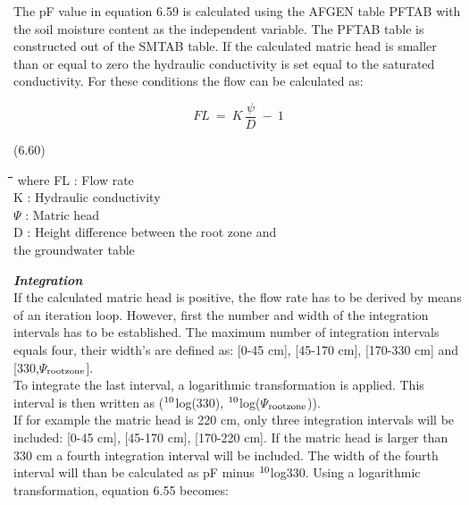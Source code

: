 \documentclass[11pt]{article}
\begin{document}
\bigskip
The pF value in equation 6.59 is calculated using the AFGEN table PFTAB with the soil
moisture content as the independent variable. The PFTAB table is constructed out of the
SMTAB table. If the calculated matric head is smaller than or equal to zero the hydraulic
conduc\-tivity is set equal to the saturated conductivity. For these conditions the flow can
be calculat\-ed as:

\begin{displaymath}
FL~=~K\,{\frac{\psi }{D}} ~-~ 1
\end{displaymath}

 \bigskip
\strut\hfill (6.60)

\nwln
\begin{tabbing}
\hspace{1.27cm}\=\hspace{1.27cm}\=\hspace{1.27cm}\=\hspace{1.27cm}\=%
\hspace{1.27cm}\=\hspace{1.27cm}\=\hspace{1.27cm}\=\hspace{1.27cm}\=%
\hspace{1.27cm}\=\hspace{1.27cm}\=\kill
where\> FL\> : Flow rate\> \> \> \> \> \> \> \> [cm d$^{{\rm -1}}$]\\
\>K \> : Hydraulic conductivity\> \> \> \> \> \> \> \> [cm d$^{{\rm -1}}$]\\
\>$\Psi$\> : Matric head\> \> \> \> \> \> \> \> [cm]\\
\>D\> : Height difference between the root zone and \\
\>\>  the groundwater table\> \> \> \> \> \> \> \> [cm]
\end{tabbing}

\bigskip
\bigskip
{\bf {\it Integration\/}}\\
If the calculated matric head is positive, the flow rate has to be derived by means of an
iteration loop. However, first the number and width of the integration intervals has to be
established. The maximum number of integration intervals equals four, their width's are
defined as: [0-45 cm], [45-170 cm], [170-330 cm] and [330,$\Psi$$_{{\rm rootzone}}$].\\
To integrate the last interval, a logarithmic transformation is applied. This interval is then
written as ($^{{\rm 10}}$log(330), $^{{\rm 10}}$log($\Psi$$_{{\rm rootzone}}$)).\\
If for example the matric head is 220 cm, only three integration intervals will be
included: [0-45 cm], [45-170 cm], [170-220 cm]. If the matric head is larger than 330 cm
a fourth integration interval will be included. The width of the fourth interval will than be
calculated as pF minus $^{{\rm 10}}$log330. Using a logarithmic transformation, equation 6.55
becomes:
\end{document}
